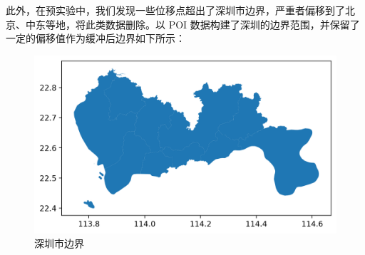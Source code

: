 \documentclass[12pt,a4paper,oneside]{ctexart}
\begin{document}
\begin{figure}[H]
    \centering
    \label{fig:combine}
\end{figure}


此外，在预实验中，我们发现一些位移点超出了深圳市边界，严重者偏移到了北京、中东等地，将此类数据删除。以 POI 数据构建了深圳的边界范围，并保留了一定的偏移值作为缓冲后边界如下所示：

\begin{figure}[H]
    \centering
    \includegraphics[width=\linewidth]{Figs/深圳市边界.png}
    \caption{深圳市边界}
    \label{fig:boundary}
\end{figure}
\end{document}
